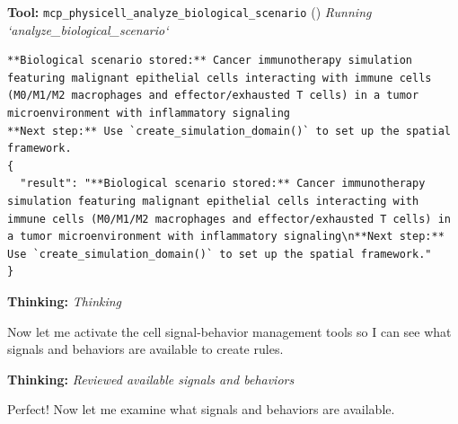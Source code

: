 \documentclass[11pt,a4paper]{article}
\begin{document}
\begin{toolokbox}
\textbf{Tool:} \texttt{mcp\_physicell\_analyze\_biological\_scenario} (\checkmark)
\textit{Running `analyze\_biological\_scenario`}
\begin{lstlisting}
**Biological scenario stored:** Cancer immunotherapy simulation featuring malignant epithelial cells interacting with immune cells (M0/M1/M2 macrophages and effector/exhausted T cells) in a tumor microenvironment with inflammatory signaling
**Next step:** Use `create_simulation_domain()` to set up the spatial framework.
{
  "result": "**Biological scenario stored:** Cancer immunotherapy simulation featuring malignant epithelial cells interacting with immune cells (M0/M1/M2 macrophages and effector/exhausted T cells) in a tumor microenvironment with inflammatory signaling\n**Next step:** Use `create_simulation_domain()` to set up the spatial framework."
}
\end{lstlisting}
\end{toolokbox}
\begin{thinkbox}
\textbf{Thinking:} \textit{Thinking}

Now let me activate the cell signal-behavior management tools so I can see what signals and behaviors are available to create rules.

\end{thinkbox}
\begin{thinkbox}
\textbf{Thinking:} \textit{Reviewed available signals and behaviors}

Perfect! Now let me examine what signals and behaviors are available.

\end{thinkbox}
\end{document}

